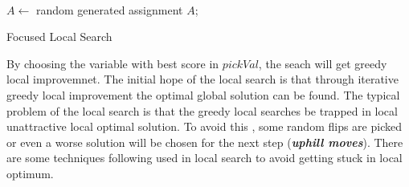 \documentclass[12pt,a4paper,twoside]{scrartcl}
\numberwithin{equation}{section}
\begin{document}
\\
\begin{algorithm}[h!]
  $A \leftarrow$ random generated assignment  $A$;\;
 \caption{Focused Local Search}
\end{algorithm}  

By choosing the variable with best score in $pickVal$, the seach will get greedy local improvemnet. 
The initial hope of the local search is that through iterative greedy local improvement the optimal global solution can be found. The typical problem of the local search is that the greedy local searches be trapped in local unattractive local optimal solution.  To avoid this , some random flips are picked or even a worse solution  will be chosen for the next step (\emph{\textbf{uphill moves}}). There are some techniques following used in local search to avoid getting stuck in local optimum.
\end{document}
